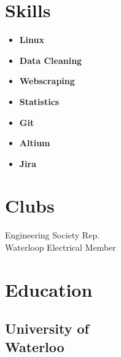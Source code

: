 \documentclass[]{chandan-cv}
\begin{document}
\begin{minipage}[t]{0.26\textwidth}
\section{Skills}
	\begin{itemize}
		\setlength\itemsep{-0.2em}
		\item \textbf{Linux}
		\item \textbf{Data Cleaning}
		\item \textbf{Webscraping}
		\item \textbf{Statistics}
		\item \textbf{Git}
		\item \textbf{Altium}
		\item \textbf{Jira}
	\end{itemize}
\sectionsep


\section{Clubs}
Engineering Society Rep.\\
Waterloop Electrical Member
\sectionsep



\section{Education}

\subsection{University of \\
Waterloo}
\sectionsep


%
%

\end{minipage}
\hfill
\end{document}
